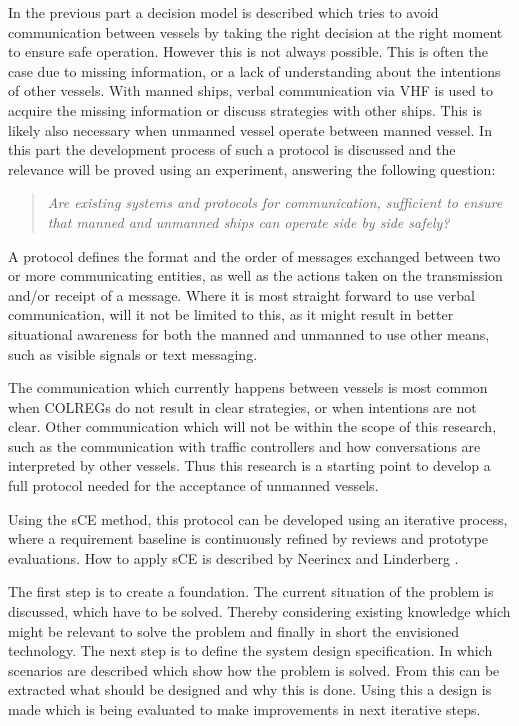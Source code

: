 In the previous part a decision model is described which tries to avoid communication between vessels by taking the right decision at the right moment to ensure safe operation. However this is not always possible. This is often the case due to missing information, or a lack of understanding about the intentions of other vessels. With manned ships, verbal communication via \ac{VHF} is used to acquire the missing information or discuss strategies with other ships. This is likely also necessary when unmanned vessel operate between manned vessel. In this part the development process of such a protocol is discussed and the relevance will be proved using an experiment, answering the following question:

\begin{quotation}
	\emph{Are existing systems and protocols for communication, sufficient to ensure that manned and unmanned ships can operate side by side safely?}
\end{quotation}

A protocol defines the format and the order of messages exchanged between two or more communicating entities, as well as the actions taken on the transmission and/or receipt of a message. Where it is most straight forward to use verbal communication, will it not be limited to this, as it might result in better situational awareness for both the manned and unmanned to use other means, such as visible signals or text messaging.

The communication which currently happens between vessels is most common when \ac{COLREGs} do not result in clear strategies, or when intentions are not clear. Other communication which will not be within the scope of this research, such as the communication with traffic controllers and how conversations are interpreted by other vessels.
Thus this research is a starting point to develop a full protocol needed for the acceptance of unmanned vessels.

Using the \acf{sCE} method, this protocol can be developed using an iterative process, where a  requirement baseline is continuously refined by reviews and prototype evaluations. How to apply \ac{sCE} is described by Neerincx and Linderberg \cite{Neerincx2012}.

The first step is to create a foundation. The current situation of the problem is discussed, which have to be solved. Thereby considering existing knowledge which might be relevant to solve the problem and finally in short the envisioned technology. The next step is to define the system design specification. In which scenarios are described which show how the problem is solved. From this can be extracted what should be designed and why this is done. Using this a design is made which is being evaluated to make improvements in next iterative steps.